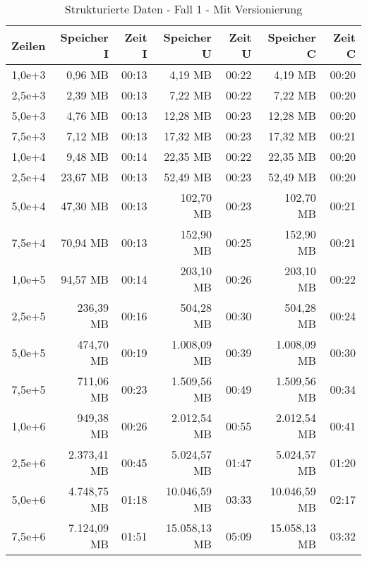 \begin{table}
    \centering
    \begin{tabular}{|r|r|r|r|r|r|r|}
        \hline
        \textbf{Zeilen} & \textbf{Speicher I} & \textbf{Zeit I} & \textbf{Speicher U} & \textbf{Zeit U} & \textbf{Speicher C} & \textbf{Zeit C} \\ \hline
        1,0e+3  & 0,96 MB       & 00:13 & 4,19 MB       & 00:22 & 4,19 MB       & 00:20 \\ \hline
        2,5e+3  & 2,39 MB       & 00:13 & 7,22 MB       & 00:22 & 7,22 MB       & 00:20 \\ \hline
        5,0e+3  & 4,76 MB       & 00:13 & 12,28 MB      & 00:23 & 12,28 MB      & 00:20 \\ \hline
        7,5e+3  & 7,12 MB       & 00:13 & 17,32 MB      & 00:23 & 17,32 MB      & 00:21 \\ \hline
        1,0e+4  & 9,48 MB       & 00:14 & 22,35 MB      & 00:22 & 22,35 MB      & 00:20 \\ \hline
        2,5e+4  & 23,67 MB      & 00:13 & 52,49 MB      & 00:23 & 52,49 MB      & 00:20 \\ \hline
        5,0e+4  & 47,30 MB      & 00:13 & 102,70 MB     & 00:23 & 102,70 MB     & 00:21 \\ \hline
        7,5e+4  & 70,94 MB      & 00:13 & 152,90 MB     & 00:25 & 152,90 MB     & 00:21 \\ \hline
        1,0e+5  & 94,57 MB      & 00:14 & 203,10 MB     & 00:26 & 203,10 MB     & 00:22 \\ \hline
        2,5e+5  & 236,39 MB     & 00:16 & 504,28 MB     & 00:30 & 504,28 MB     & 00:24 \\ \hline
        5,0e+5  & 474,70 MB     & 00:19 & 1.008,09 MB   & 00:39 & 1.008,09 MB   & 00:30 \\ \hline
        7,5e+5  & 711,06 MB     & 00:23 & 1.509,56 MB   & 00:49 & 1.509,56 MB   & 00:34 \\ \hline
        1,0e+6 & 949,38 MB     & 00:26 & 2.012,54 MB   & 00:55 & 2.012,54 MB   & 00:41 \\ \hline
        2,5e+6 & 2.373,41 MB   & 00:45 & 5.024,57 MB   & 01:47 & 5.024,57 MB   & 01:20 \\ \hline
        5,0e+6 & 4.748,75 MB   & 01:18 & 10.046,59 MB  & 03:33 & 10.046,59 MB  & 02:17 \\ \hline
        7,5e+6 & 7.124,09 MB   & 01:51 & 15.058,13 MB  & 05:09 & 15.058,13 MB  & 03:32 \\ \hline
    \end{tabular}
    \caption{Strukturierte Daten - Fall 1 - Mit Versionierung}
\end{table}

